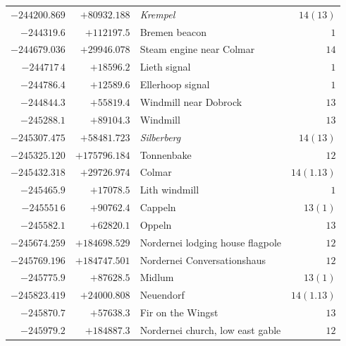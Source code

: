 \begin{center}
\begin{tabular}{r|r|p{170pt}|r}
\(-244200.869\)&\(+80932.188\)&\textit{Krempel}&\(14(13)\)\\
\(-244319.6\)&\(+112197.5\)&Bremen beacon&\(1\)\\
\(-244679.036\)&\(+29946.078\)&Steam engine near Colmar&\(14\)\\
\(-244717\,4\)&\(+18596.2\)&Lieth signal&\(1\)\\
\(-244786.4\)&\(+12589.6\)&Ellerhoop signal&\(1\)\\
\(-244844.3\)&\(+55819.4\)&Windmill near Dobrock&\(13\)\\
\(-245288.1\)&\(+89104.3\)&Windmill&\(13\)\\
\(-245307.475\)&\(+58481.723\)&\textit{Silberberg}&\(14(13)\)\\
\(-245325.120\)&\(+175796.184\)&Tonnenbake&\(12\)\\
\(-245432.318\)&\(+29726.974\)&Colmar&\(14(1.13)\)\\
\(-245465.9\)&\(+17078.5\)&Lith windmill&\(1\)\\
\(-245551\,6\)&\(+90762.4\)&Cappeln&\(13(1)\)\\
\(-245582.1\)&\(+62820.1\)&Oppeln&\(13\)\\
\(-245674.259\)&\(+184698.529\)&Nordernei lodging house flagpole&\(12\)\\
\(-245769.196\)&\(+184747.501\)&Nordernei Conversationshaus&\(12\)\\
\(-245775.9\)&\(+87628.5\)&Midlum&\(13(1)\)\\
\(-245823.419\)&\(+24000.808\)&Neuendorf&\(14(1.13)\)\\
\(-245870.7\)&\(+57638.3\)&Fir on the Wingst&\(13\)\\
\(-245979.2\)&\(+184887.3\)&Nordernei church, low east gable&\(12\)\\
\hline\end{tabular}\endgroup\end{center}
